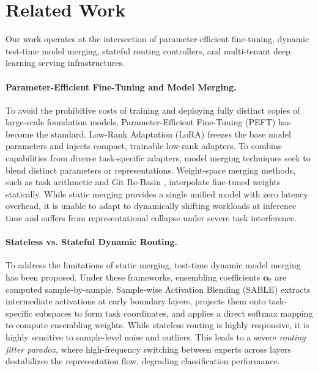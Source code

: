 \section{Related Work}
\label{sec:related_work}

Our work operates at the intersection of parameter-efficient fine-tuning, dynamic test-time model merging, stateful routing controllers, and multi-tenant deep learning serving infrastructures.

\paragraph{Parameter-Efficient Fine-Tuning and Model Merging.}
To avoid the prohibitive costs of training and deploying fully distinct copies of large-scale foundation models, Parameter-Efficient Fine-Tuning (PEFT) has become the standard. Low-Rank Adaptation (LoRA) \cite{hu2021lora} freezes the base model parameters and injects compact, trainable low-rank adapters. To combine capabilities from diverse task-specific adapters, model merging techniques seek to blend distinct parameters or representations. Weight-space merging methods, such as task arithmetic \cite{ilharco2022editing} and Git Re-Basin \cite{ainsworth2022git}, interpolate fine-tuned weights statically. While static merging provides a single unified model with zero latency overhead, it is unable to adapt to dynamically shifting workloads at inference time and suffers from representational collapse under severe task interference.

\paragraph{Stateless vs. Stateful Dynamic Routing.}
To address the limitations of static merging, test-time dynamic model merging has been proposed. Under these frameworks, ensembling coefficients $\boldsymbol{\alpha}_t$ are computed sample-by-sample. Sample-wise Activation Blending (SABLE) \cite{liang23sable} extracts intermediate activations at early boundary layers, projects them onto task-specific subspaces to form task coordinates, and applies a direct softmax mapping to compute ensembling weights. While stateless routing is highly responsive, it is highly sensitive to sample-level noise and outliers. This leads to a severe \emph{routing jitter paradox}, where high-frequency switching between experts across layers destabilizes the representation flow, degrading classification performance.

